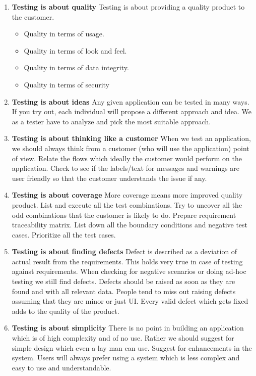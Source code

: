 \noindent
\begin{enumerate}
\item\textbf {Testing is about quality}
Testing is about providing a quality product to the customer.
    \begin{itemize}
    \item Quality in terms of usage.
    \item Quality in terms of look and feel.
	\item Quality in terms of data integrity.
    \item Quality in terms of security

    \end{itemize}
\item\textbf{Testing is about ideas}
Any given application can be tested in many ways. If you try out, each individual will propose a different approach and idea. We as a tester have to analyze and pick the most suitable approach.

\item\textbf{Testing is about thinking like a customer}
When we test an application, we should always think from a customer (who will use the application) point of view. Relate the flows which ideally the customer would perform on the application. Check to see if the labels/text for messages and warnings are user friendly so that the customer understands the issue if any.

\item\textbf{Testing is about coverage}
More coverage means more improved quality product. List and execute all the test combinations. Try to uncover all the odd combinations that the customer is likely to do. Prepare requirement traceability matrix. List down all the boundary conditions and negative test cases. Prioritize all the test cases.

\item\textbf{Testing is about finding defects}
Defect is described as a deviation of actual result from the requirements. This holds very true in case of testing against requirements. When checking for negative scenarios or doing ad-hoc testing we still find defects. Defects should be raised as soon as they are found and with all relevant data. People tend to miss out raising defects assuming that they are minor or just UI. Every valid defect which gets fixed adds to the quality of the product.

\item\textbf{Testing is about simplicity}
There is no point in building an application which is of high complexity and of no use. Rather we should suggest for simple design which even a lay man can use. Suggest for enhancements in the system. Users will always prefer using a system which is less complex and easy to use and understandable.


\end{enumerate}
